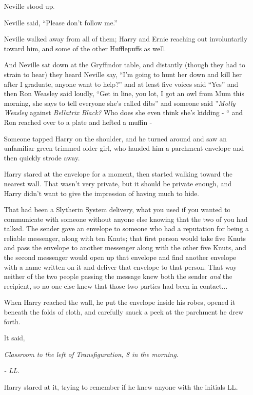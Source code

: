 Neville stood up.

Neville said, ``Please don't follow me.''

Neville walked away from all of them; Harry and Ernie reaching out
involuntarily toward him, and some of the other Hufflepuffs as well.

And Neville sat down at the Gryffindor table, and distantly (though they
had to strain to hear) they heard Neville say, ``I'm going to hunt her
down and kill her after I graduate, anyone want to help?'' and at least
five voices said ``Yes'' and then Ron Weasley said loudly, ``Get in
line, you lot, I got an owl from Mum this morning, she says to tell
everyone she's called dibs'' and someone said ''\emph{Molly Weasley}
against \emph{Bellatrix Black?} Who does she even think she's kidding -
`` and Ron reached over to a plate and hefted a muffin -

Someone tapped Harry on the shoulder, and he turned around and saw an
unfamiliar green-trimmed older girl, who handed him a parchment envelope
and then quickly strode away.

Harry stared at the envelope for a moment, then started walking toward
the nearest wall. That wasn't very private, but it should be private
enough, and Harry didn't want to give the impression of having much to
hide.

That had been a Slytherin System delivery, what you used if you wanted
to communicate with someone without anyone else knowing that the two of
you had talked. The sender gave an envelope to someone who had a
reputation for being a reliable messenger, along with ten Knuts; that
first person would take five Knuts and pass the envelope to another
messenger along with the other five Knuts, and the second messenger
would open up that envelope and find another envelope with a name
written on it and deliver that envelope to that person. That way neither
of the two people passing the message knew both the sender \emph{and}
the recipient, so no one else knew that those two parties had been in
contact...

When Harry reached the wall, he put the envelope inside his robes,
opened it beneath the folds of cloth, and carefully snuck a peek at the
parchment he drew forth.

It said,

\emph{Classroom to the left of Transfiguration, 8 in the morning.}

\emph{- LL.}

Harry stared at it, trying to remember if he knew anyone with the
initials LL.

